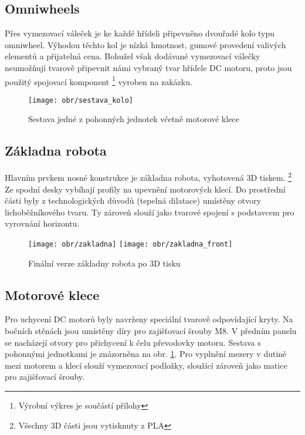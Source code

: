 \subsection{Omniwheels}
\label{omni}

Přes vymezovací váleček je ke každé hřídeli připevněno dvouřadé kolo typu omniwheel. Výhodou těchto kol je nízká hmotnost, gumové provedení valivých elementů a přijatelná cena. Bohužel však dodávané vymezovací válečky neumožňují tvarově připevnit námi vybraný tvar hřídele DC motoru, proto jsou použitý spojovací komponent \footnote{Výrobní výkres je součástí přílohy} vyroben na zakázku. 

\begin{figure}[htb]
\begin{center}
\texttt{[image: obr/sestava\_kolo]}
\end{center}
\caption{Sestava jedné z pohonných jednotek včetně motorové klece}
\label{sestavicka}
\end{figure}

\subsection{Základna robota}
\label{base}

Hlavním prvkem nosné konstrukce je základna robota, vyhotovená 3D tiskem. \footnote{Všechny 3D části jsou vytisknuty z PLA} Ze spodní desky vybíhají profily na upevnění motorových klecí. Do prostřední části byly z technologických důvodů (tepelná dilatace) umístěny otvory lichoběžníkového tvaru. Ty zároveň slouží jako tvarové spojení s podstavcem pro vyrovnání horizontu. 

\begin{figure}[hb]
\begin{center}
\texttt{[image: obr/zakladna]}
\texttt{[image: obr/zakladna\_front]}
\end{center}
\caption{Finální verze základny robota po 3D tisku}
\label{cocka}
\end{figure}

\subsection{Motorové klece}
\label{klece}

Pro uchycení DC motorů byly navrženy speciální tvarově odpovídající kryty. Na bočních stěnách jsou umístěny díry pro zajišťovací šrouby M8. V předním panelu se nacházejí otvory pro přichycení k čelu převodovky motoru. Sestava s pohonnými jednotkami je znázorněna na obr. \ref{sestavicka}. Pro vyplnění mezery v dutině mezi motorem a klecí slouží vymezovací podložky, sloužící zároveň jako matice pro zajišťovací šrouby.

